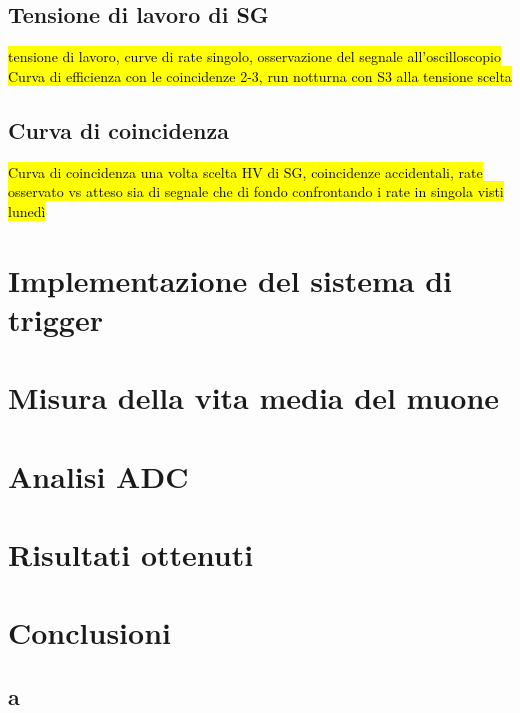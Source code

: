 \documentclass[a4paper, 11pt]{article}
\newcommand{\WIP}[1]{{\sethlcolor{cyan}\hl{#1}}}
\begin{document}
    \subsection{Tensione di lavoro di SG}
        \hl{tensione di lavoro, curve di rate singolo, osservazione del segnale all'oscilloscopio} \WIP{Curva di efficienza con le coincidenze 2-3, run notturna con S3 alla tensione scelta}

    \subsection{Curva di coincidenza}
        \WIP{Curva di coincidenza una volta scelta HV di SG, coincidenze accidentali, rate osservato vs atteso sia di segnale che di fondo confrontando i rate in singola visti lunedì}


\section{Implementazione del sistema di trigger}

\section{Misura della vita media del muone}

\section{Analisi ADC}

\section{Risultati ottenuti}

\section{Conclusioni}

\printbibliography

\newpage
\begin{appendices}
  \section{a}
\end{appendices}
\end{document}

